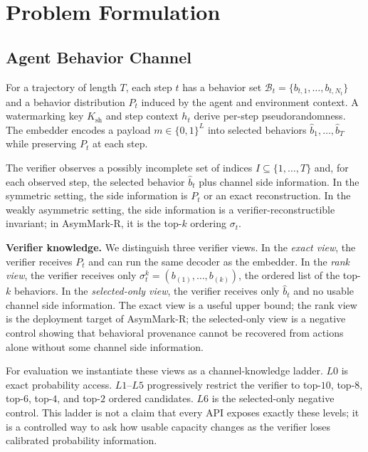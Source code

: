 \documentclass[conference,compsoc]{IEEEtran}
\newcommand{\ours}{AsymMark-R}
\newcommand{\B}{\mathcal{B}}
\begin{document}
\section{Problem Formulation}
\label{sec:formulation}

\subsection{Agent Behavior Channel}

For a trajectory of length $T$, each step $t$ has a behavior set $\B_t=\{b_{t,1},\ldots,b_{t,N_t}\}$ and a behavior distribution $P_t$ induced by the agent and environment context. A watermarking key $K_{\mathrm{sh}}$ and step context $h_t$ derive per-step pseudorandomness. The embedder encodes a payload $m\in\{0,1\}^L$ into selected behaviors $\hat b_1,\ldots,\hat b_T$ while preserving $P_t$ at each step.

The verifier observes a possibly incomplete set of indices $I\subseteq\{1,\ldots,T\}$ and, for each observed step, the selected behavior $\hat b_t$ plus channel side information. In the symmetric setting, the side information is $P_t$ or an exact reconstruction. In the weakly asymmetric setting, the side information is a verifier-reconstructible invariant; in \ours{}, it is the top-$k$ ordering $\sigma_t$.

\textbf{Verifier knowledge.}
We distinguish three verifier views. In the \emph{exact view}, the verifier receives $P_t$ and can run the same decoder as the embedder. In the \emph{rank view}, the verifier receives only $\sigma_t^k=(b_{(1)},\ldots,b_{(k)})$, the ordered list of the top-$k$ behaviors. In the \emph{selected-only view}, the verifier receives only $\hat b_t$ and no usable channel side information. The exact view is a useful upper bound; the rank view is the deployment target of \ours{}; the selected-only view is a negative control showing that behavioral provenance cannot be recovered from actions alone without some channel side information.

For evaluation we instantiate these views as a channel-knowledge ladder. $L0$ is exact probability access. $L1$--$L5$ progressively restrict the verifier to top-$10$, top-$8$, top-$6$, top-$4$, and top-$2$ ordered candidates. $L6$ is the selected-only negative control. This ladder is not a claim that every API exposes exactly these levels; it is a controlled way to ask how usable capacity changes as the verifier loses calibrated probability information.
\end{document}
